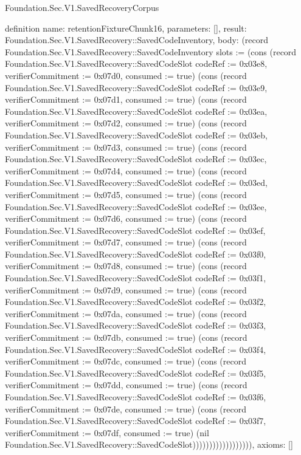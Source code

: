 \begin{lexlean}{Foundation.Sec.V1.SavedRecoveryCorpus}
\begin{semanticmodule}
definition{
  name: retentionFixtureChunk16,
  parameters: [],
  result: Foundation.Sec.V1.SavedRecovery::SavedCodeInventory,
  body: (record Foundation.Sec.V1.SavedRecovery::SavedCodeInventory {slots := (cons (record Foundation.Sec.V1.SavedRecovery::SavedCodeSlot {codeRef := 0x03e8, verifierCommitment := 0x07d0, consumed := true}) (cons (record Foundation.Sec.V1.SavedRecovery::SavedCodeSlot {codeRef := 0x03e9, verifierCommitment := 0x07d1, consumed := true}) (cons (record Foundation.Sec.V1.SavedRecovery::SavedCodeSlot {codeRef := 0x03ea, verifierCommitment := 0x07d2, consumed := true}) (cons (record Foundation.Sec.V1.SavedRecovery::SavedCodeSlot {codeRef := 0x03eb, verifierCommitment := 0x07d3, consumed := true}) (cons (record Foundation.Sec.V1.SavedRecovery::SavedCodeSlot {codeRef := 0x03ec, verifierCommitment := 0x07d4, consumed := true}) (cons (record Foundation.Sec.V1.SavedRecovery::SavedCodeSlot {codeRef := 0x03ed, verifierCommitment := 0x07d5, consumed := true}) (cons (record Foundation.Sec.V1.SavedRecovery::SavedCodeSlot {codeRef := 0x03ee, verifierCommitment := 0x07d6, consumed := true}) (cons (record Foundation.Sec.V1.SavedRecovery::SavedCodeSlot {codeRef := 0x03ef, verifierCommitment := 0x07d7, consumed := true}) (cons (record Foundation.Sec.V1.SavedRecovery::SavedCodeSlot {codeRef := 0x03f0, verifierCommitment := 0x07d8, consumed := true}) (cons (record Foundation.Sec.V1.SavedRecovery::SavedCodeSlot {codeRef := 0x03f1, verifierCommitment := 0x07d9, consumed := true}) (cons (record Foundation.Sec.V1.SavedRecovery::SavedCodeSlot {codeRef := 0x03f2, verifierCommitment := 0x07da, consumed := true}) (cons (record Foundation.Sec.V1.SavedRecovery::SavedCodeSlot {codeRef := 0x03f3, verifierCommitment := 0x07db, consumed := true}) (cons (record Foundation.Sec.V1.SavedRecovery::SavedCodeSlot {codeRef := 0x03f4, verifierCommitment := 0x07dc, consumed := true}) (cons (record Foundation.Sec.V1.SavedRecovery::SavedCodeSlot {codeRef := 0x03f5, verifierCommitment := 0x07dd, consumed := true}) (cons (record Foundation.Sec.V1.SavedRecovery::SavedCodeSlot {codeRef := 0x03f6, verifierCommitment := 0x07de, consumed := true}) (cons (record Foundation.Sec.V1.SavedRecovery::SavedCodeSlot {codeRef := 0x03f7, verifierCommitment := 0x07df, consumed := true}) (nil Foundation.Sec.V1.SavedRecovery::SavedCodeSlot)))))))))))))))))}),
  axioms: []
}


\end{semanticmodule}
\end{lexlean}
